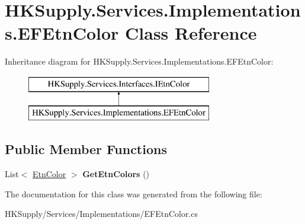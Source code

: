 \hypertarget{class_h_k_supply_1_1_services_1_1_implementations_1_1_e_f_etn_color}{}\section{H\+K\+Supply.\+Services.\+Implementations.\+E\+F\+Etn\+Color Class Reference}
\label{class_h_k_supply_1_1_services_1_1_implementations_1_1_e_f_etn_color}
Inheritance diagram for H\+K\+Supply.\+Services.\+Implementations.\+E\+F\+Etn\+Color\+:\begin{figure}[H]
\begin{center}
\leavevmode
\includegraphics[height=2.000000cm]{class_h_k_supply_1_1_services_1_1_implementations_1_1_e_f_etn_color}
\end{center}
\end{figure}
\subsection*{Public Member Functions}
\begin{DoxyCompactItemize}
\item 
\mbox{\label{class_h_k_supply_1_1_services_1_1_implementations_1_1_e_f_etn_color_a2e61d3fae7f2a6eb0e70fcb959f2e568}} 
List$<$ \mbox{\hyperlink{class_h_k_supply_1_1_models_1_1_etn_color}{Etn\+Color}} $>$ {\bfseries Get\+Etn\+Colors} ()
\end{DoxyCompactItemize}


The documentation for this class was generated from the following file\+:\begin{DoxyCompactItemize}
\item 
H\+K\+Supply/\+Services/\+Implementations/E\+F\+Etn\+Color.\+cs\end{DoxyCompactItemize}
